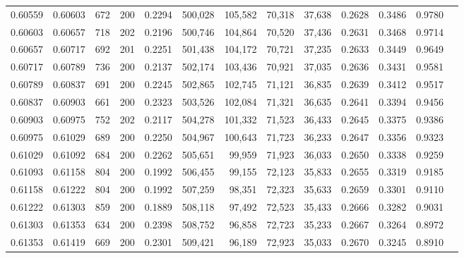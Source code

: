 \begin{tabular}{rrrrrrrrrrrrr}
0.60559 & 0.60603 &   672 & 200 &                                     0.2294 & 500,028 & 105,582 &  70,318 &  37,638 & 0.2628 & 0.3486 & 0.9780 \\
0.60603 & 0.60657 &   718 & 202 &                                     0.2196 & 500,746 & 104,864 &  70,520 &  37,436 & 0.2631 & 0.3468 & 0.9714 \\
0.60657 & 0.60717 &   692 & 201 &                                     0.2251 & 501,438 & 104,172 &  70,721 &  37,235 & 0.2633 & 0.3449 & 0.9649 \\
0.60717 & 0.60789 &   736 & 200 &                                     0.2137 & 502,174 & 103,436 &  70,921 &  37,035 & 0.2636 & 0.3431 & 0.9581 \\
0.60789 & 0.60837 &   691 & 200 &                                     0.2245 & 502,865 & 102,745 &  71,121 &  36,835 & 0.2639 & 0.3412 & 0.9517 \\
0.60837 & 0.60903 &   661 & 200 &                                     0.2323 & 503,526 & 102,084 &  71,321 &  36,635 & 0.2641 & 0.3394 & 0.9456 \\
0.60903 & 0.60975 &   752 & 202 &                                     0.2117 & 504,278 & 101,332 &  71,523 &  36,433 & 0.2645 & 0.3375 & 0.9386 \\
0.60975 & 0.61029 &   689 & 200 &                                     0.2250 & 504,967 & 100,643 &  71,723 &  36,233 & 0.2647 & 0.3356 & 0.9323 \\
0.61029 & 0.61092 &   684 & 200 &                                     0.2262 & 505,651 &  99,959 &  71,923 &  36,033 & 0.2650 & 0.3338 & 0.9259 \\
0.61093 & 0.61158 &   804 & 200 &                                     0.1992 & 506,455 &  99,155 &  72,123 &  35,833 & 0.2655 & 0.3319 & 0.9185 \\
0.61158 & 0.61222 &   804 & 200 &                                     0.1992 & 507,259 &  98,351 &  72,323 &  35,633 & 0.2659 & 0.3301 & 0.9110 \\
0.61222 & 0.61303 &   859 & 200 &                                     0.1889 & 508,118 &  97,492 &  72,523 &  35,433 & 0.2666 & 0.3282 & 0.9031 \\
0.61303 & 0.61353 &   634 & 200 &                                     0.2398 & 508,752 &  96,858 &  72,723 &  35,233 & 0.2667 & 0.3264 & 0.8972 \\
0.61353 & 0.61419 &   669 & 200 &                                     0.2301 & 509,421 &  96,189 &  72,923 &  35,033 & 0.2670 & 0.3245 & 0.8910 \\

\end{tabular}
